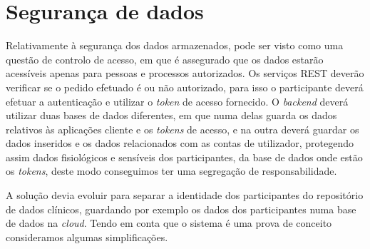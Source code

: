 \section{Segurança de dados}
\label{cap6:protecaodados}
Relativamente à segurança dos dados armazenados, pode ser visto como uma questão de controlo de acesso, em que é assegurado que os dados estarão acessíveis apenas para pessoas e processos autorizados. Os serviços \gls{REST} deverão verificar se o pedido efetuado é ou não autorizado, para isso o participante deverá efetuar a autenticação e utilizar o \textit{token} de acesso fornecido. O \textit{backend} deverá utilizar duas bases de dados diferentes, em que numa delas guarda os dados relativos às aplicações cliente e os \textit{tokens} de acesso, e na outra deverá guardar os dados inseridos e os dados relacionados com as contas de utilizador, protegendo assim dados fisiológicos e sensíveis dos participantes, da base de dados onde estão os \textit{tokens}, deste modo conseguimos ter uma segregação de responsabilidade. \par
A solução devia evoluir para separar a identidade dos participantes do repositório de dados clínicos, guardando por exemplo os dados dos participantes numa base de dados na \textit{cloud}. Tendo em conta que o sistema é uma prova de conceito consideramos algumas simplificações.

\cleardoublepage
